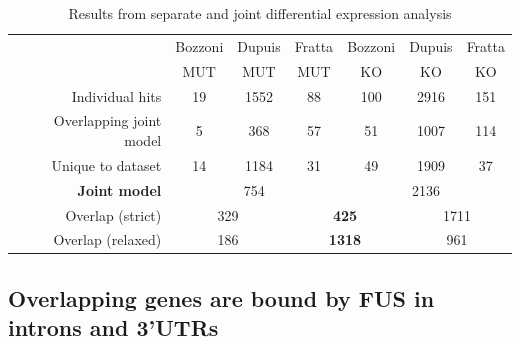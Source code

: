 \begingroup
\renewcommand{\arraystretch}{1.5}
\begin{table}[h!]
		\begin{tabular}{|r|ccc|ccc|}
			\hline
			& Bozzoni & Dupuis & Fratta & Bozzoni & Dupuis & Fratta\\[-0.3cm]
			& MUT & MUT & MUT & KO & KO & KO\\
			\hline
			Individual hits                & 19 & 1552 & 88 & 100 & 2916 & 151 \\
			Overlapping joint model & 5 & 368 & 57 & 51 & 1007 & 114 \\
			Unique to dataset          & 14 & 1184 & 31 & 49 & 1909 & 37 \\
			\hline
			\textbf{Joint model}       & \multicolumn{3}{c|}{754} & \multicolumn{3}{c|}{2136} \\
			\hline
			Overlap (strict)              & \multicolumn{2}{c}{329} & \multicolumn{2}{|c|}{\textbf{425}} & \multicolumn{2}{c|}{1711} \\
			Overlap (relaxed)           & \multicolumn{2}{c}{186} & \multicolumn{2}{|c|}{\textbf{1318} } & \multicolumn{2}{c|}{961} \\
			\hline
		\end{tabular}
	\caption{Results from separate and joint differential expression analysis}
	\label{tab:expression_results}
\end{table}
\endgroup


\subsection{ Overlapping genes are bound by FUS in introns and 3'UTRs}

